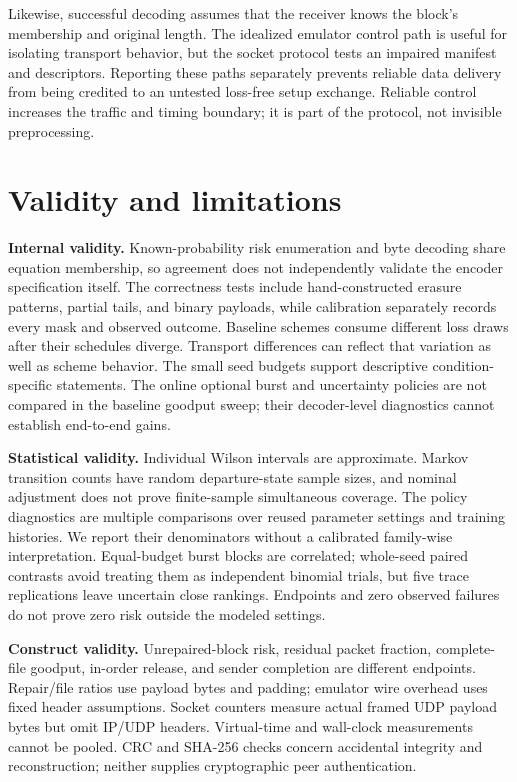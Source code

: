 \documentclass[11pt,a4paper]{article}
\begin{document}
Likewise, successful decoding assumes that the receiver knows the block's membership and original length. The idealized emulator control path is useful for isolating transport behavior, but the socket protocol tests an impaired manifest and descriptors. Reporting these paths separately prevents reliable data delivery from being credited to an untested loss-free setup exchange. Reliable control increases the traffic and timing boundary; it is part of the protocol, not invisible preprocessing.

\section{Validity and limitations}
\textbf{Internal validity.} Known-probability risk enumeration and byte decoding share equation membership, so agreement does not independently validate the encoder specification itself. The correctness tests include hand-constructed erasure patterns, partial tails, and binary payloads, while calibration separately records every mask and observed outcome. Baseline schemes consume different loss draws after their schedules diverge. Transport differences can reflect that variation as well as scheme behavior. The small seed budgets support descriptive condition-specific statements. The online optional burst and uncertainty policies are not compared in the baseline goodput sweep; their decoder-level diagnostics cannot establish end-to-end gains.

\textbf{Statistical validity.} Individual Wilson intervals are approximate. Markov transition counts have random departure-state sample sizes, and nominal adjustment does not prove finite-sample simultaneous coverage. The policy diagnostics are multiple comparisons over reused parameter settings and training histories. We report their denominators without a calibrated family-wise interpretation. Equal-budget burst blocks are correlated; whole-seed paired contrasts avoid treating them as independent binomial trials, but five trace replications leave uncertain close rankings. Endpoints and zero observed failures do not prove zero risk outside the modeled settings.

\textbf{Construct validity.} Unrepaired-block risk, residual packet fraction, complete-file goodput, in-order release, and sender completion are different endpoints. Repair/file ratios use payload bytes and padding; emulator wire overhead uses fixed header assumptions. Socket counters measure actual framed UDP payload bytes but omit IP/UDP headers. Virtual-time and wall-clock measurements cannot be pooled. CRC and SHA-256 checks concern accidental integrity and reconstruction; neither supplies cryptographic peer authentication.
\end{document}
